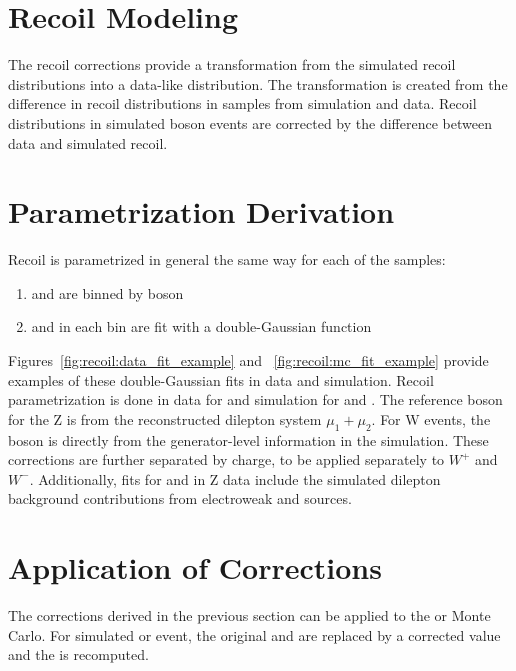 
\section{Recoil Modeling} \label{ch:recoil:modeling}
The recoil corrections provide a transformation from the simulated recoil distributions into a data-like distribution. The transformation is created from the difference in recoil distributions in \zll samples from simulation and data. Recoil distributions in simulated \W boson events are corrected by the difference between data and simulated \zll recoil.

\section{Parametrization Derivation}
Recoil is parametrized in general the same way for each of the samples:
\begin{enumerate}
\item \upar and \uprp are binned by boson \pt
\item \upar and \uprp  in each \pt bin are fit with a double-Gaussian function
\end{enumerate}
Figures~\ref{fig:recoil:data_fit_example}
 and ~\ref{fig:recoil:mc_fit_example} provide examples of these double-Gaussian fits in data and simulation. Recoil parametrization is done in data for \zmm and simulation for \zmm and \wmunu. The reference boson \pt for the Z is from the reconstructed dilepton system $\mu_1+\mu_2$. For W events, the boson \pt is directly from the generator-level information in the simulation. These corrections are further separated by charge, to be applied separately to $W^+$ and $W^-$.
Additionally, fits for \upar and \uprp in Z data include the simulated dilepton background contributions from electroweak and \ttbar sources.





\section{Application of Corrections}\label{ch:recoil:apply}
The corrections derived in the previous section can be applied to the \W or \Z Monte Carlo. For simulated \W or \Z event, the original \upar and \uprp are replaced by a corrected value and the \met is recomputed. 
